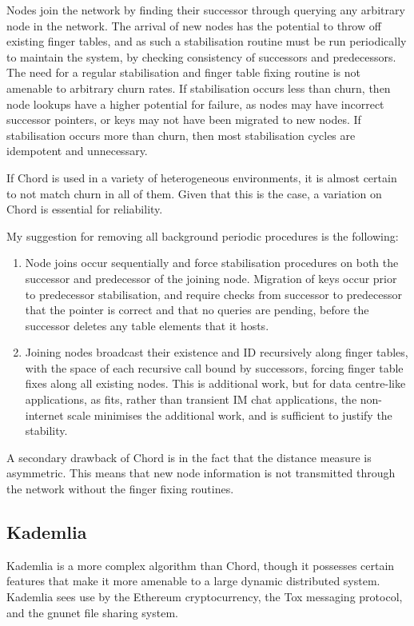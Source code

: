 Nodes join the network by finding their successor through querying any arbitrary node in the network.
The arrival of new nodes has the potential to throw off existing finger tables, and as such a stabilisation routine must be run periodically to maintain the system, by checking consistency of successors and predecessors.
The need for a regular stabilisation and finger table fixing routine is not amenable to arbitrary churn rates.
If stabilisation occurs less than churn, then node lookups have a higher potential for failure, as nodes may have incorrect successor pointers, or keys may not have been migrated to new nodes.
If stabilisation occurs more than churn, then most stabilisation cycles are idempotent and unnecessary.

If Chord is used in a variety of heterogeneous environments, it is almost certain to not match churn in all of them.
Given that this is the case, a variation on Chord is essential for reliability.

My suggestion for removing all background periodic procedures is the following:
\begin{enumerate}
\item Node joins occur sequentially and force stabilisation procedures on both the successor and predecessor of the joining node. Migration of keys occur prior to predecessor stabilisation, and require checks from successor to predecessor that the pointer is correct and that no queries are pending, before the successor deletes any table elements that it hosts.
\item Joining nodes broadcast their existence and ID recursively along finger tables, with the space of each recursive call bound by successors, forcing finger table fixes along all existing nodes. This is additional work, but for data centre-like applications, as \lsr{} fits, rather than transient IM chat applications, the non-internet scale minimises the additional work, and is sufficient to justify the stability.
\end{enumerate}

A secondary drawback of Chord is in the fact that the distance measure is asymmetric.
This means that new node information is not transmitted through the network without the finger fixing routines.

\subsection{Kademlia}

Kademlia is a more complex algorithm than Chord, though it possesses certain features that make it more amenable to a large dynamic distributed system\cite{maymounkov2002kademlia}.
Kademlia sees use by the Ethereum cryptocurrency, the Tox messaging protocol, and the gnunet file sharing system\cite{buterin2014ethereum}\cite{alkhulaiwi2016tox}\cite{wachs2014gnunet}.

